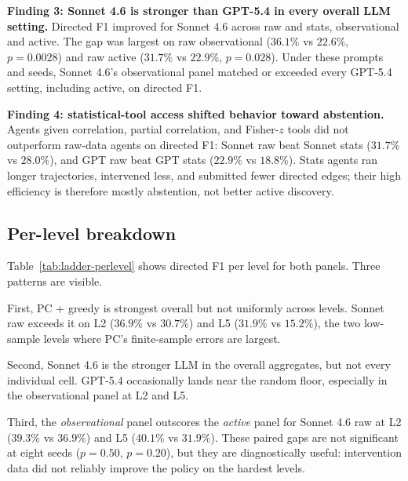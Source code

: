 \textbf{Finding 3: Sonnet 4.6 is stronger than GPT-5.4 in every overall LLM setting.} Directed F1 improved for Sonnet 4.6 across raw and stats, observational and active. The gap was largest on raw observational ($36.1\%$ vs $22.6\%$, $p=0.0028$) and raw active ($31.7\%$ vs $22.9\%$, $p=0.028$). Under these prompts and seeds, Sonnet 4.6's observational panel matched or exceeded every GPT-5.4 setting, including active, on directed F1.

\textbf{Finding 4: statistical-tool access shifted behavior toward abstention.} Agents given correlation, partial correlation, and Fisher-$z$ tools did not outperform raw-data agents on directed F1: Sonnet raw beat Sonnet stats ($31.7\%$ vs $28.0\%$), and GPT raw beat GPT stats ($22.9\%$ vs $18.8\%$). Stats agents ran longer trajectories, intervened less, and submitted fewer directed edges; their high efficiency is therefore mostly abstention, not better active discovery.

\subsection{Per-level breakdown}

Table~\ref{tab:ladder-perlevel} shows directed F1 per level for both panels. Three patterns are visible.

First, PC + greedy is strongest overall but not uniformly across levels. Sonnet raw exceeds it on L2 ($36.9\%$ vs $30.7\%$) and L5 ($31.9\%$ vs $15.2\%$), the two low-sample levels where PC's finite-sample errors are largest.

Second, Sonnet 4.6 is the stronger LLM in the overall aggregates, but not every individual cell. GPT-5.4 occasionally lands near the random floor, especially in the observational panel at L2 and L5.

Third, the \emph{observational} panel outscores the \emph{active} panel for Sonnet 4.6 raw at L2 ($39.3\%$ vs $36.9\%$) and L5 ($40.1\%$ vs $31.9\%$). These paired gaps are not significant at eight seeds ($p=0.50$, $p=0.20$), but they are diagnostically useful: intervention data did not reliably improve the policy on the hardest levels.

